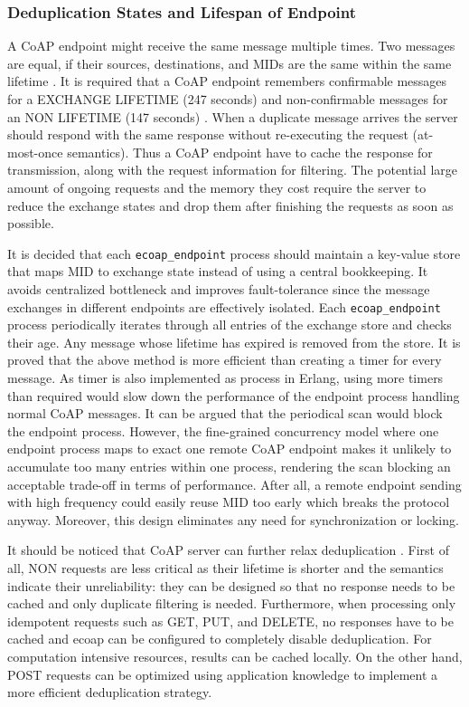 \subsubsection{Deduplication States and Lifespan of Endpoint}

A CoAP endpoint might receive the same message multiple times. Two messages are equal, if their sources, destinations, and MIDs are the same within the same lifetime \autocite{lanter2013scalability}. It is required that a CoAP endpoint remembers confirmable messages for a EXCHANGE LIFETIME (247 seconds) and non-confirmable messages for an NON LIFETIME (147 seconds) \autocite{coap_protocol}. When a duplicate message arrives the server should respond with the same response without re-executing the request (at-most-once semantics). Thus a CoAP endpoint have to cache the response for transmission, along with the request information for filtering. The potential large amount of ongoing requests and the memory they cost require the server to reduce the exchange states and drop them after finishing the requests as soon as possible. 

It is decided that each \verb|ecoap_endpoint| process should maintain a key-value store that maps MID to exchange state instead of using a central bookkeeping. It avoids centralized bottleneck and improves fault-tolerance since the message exchanges in different endpoints are effectively isolated. Each \verb|ecoap_endpoint| process periodically iterates through all entries of the exchange store and checks their age. Any message whose lifetime has expired is removed from the store. It is proved that the above method is more efficient than creating a timer for every message. As timer is also implemented as process in Erlang, using more timers than required would slow down the performance of the endpoint process handling normal CoAP messages. It can be argued that the periodical scan would block the endpoint process. However, the fine-grained concurrency model where one endpoint process maps to exact one remote CoAP endpoint makes it unlikely to accumulate too many entries within one process, rendering the scan blocking an acceptable trade-off in terms of performance. After all, a remote endpoint sending with high frequency could easily reuse MID too early which breaks the protocol anyway. Moreover, this design eliminates any need for synchronization or locking.

It should be noticed that CoAP server can further relax deduplication \autocite{coap_protocol}. First of all, NON requests are less critical as their lifetime is shorter and the semantics indicate their unreliability: they can be designed so that no response needs to be cached and only duplicate filtering is needed. Furthermore, when processing only idempotent requests such as GET, PUT, and DELETE, no responses have to be cached and ecoap can be configured to completely disable deduplication. For computation intensive resources, results can be cached locally. On the other hand, POST requests can be optimized using application knowledge to implement a more efficient deduplication strategy. 

